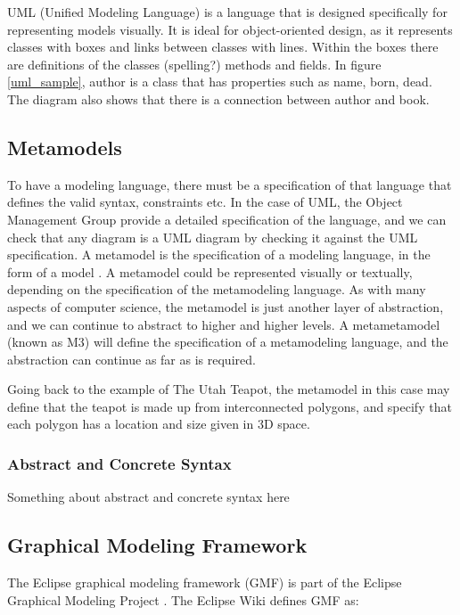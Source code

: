 UML (Unified Modeling Language) is a language that is designed specifically for representing models visually. It is ideal for object-oriented design, as it represents classes with boxes and links between classes with lines. Within the boxes there are definitions of the classes (spelling?) methods and fields. In figure \ref{uml_sample}, author is a class that has properties such as name, born, dead. The diagram also shows that there is a connection between author and book.

\subsection{Metamodels}
To have a modeling language, there must be a specification of that language that defines the valid syntax, constraints etc. In the case of UML, the Object Management Group provide a detailed specification \citep{umlSpec} of the language, and we can check that any diagram is a UML diagram by checking it against the UML specification.
A metamodel is the specification of a modeling language, in the form of a model \citep{brambillaBook}. A metamodel could be represented visually or textually, depending on the specification of the metamodeling language. As with many aspects of computer science, the metamodel is just another layer of abstraction, and we can continue to abstract to higher and higher levels. A metametamodel (known as M3) will define the specification of a metamodeling language, and the abstraction can continue as far as is required.

Going back to the example of The Utah Teapot, the metamodel in this case may define that the teapot is made up from interconnected polygons, and specify that each polygon has a location and size given in 3D space. 

\subsubsection{Abstract and Concrete Syntax}

Something about abstract and concrete syntax here

\subsection{Graphical Modeling Framework}

The Eclipse graphical modeling framework (GMF) is part of the Eclipse Graphical Modeling Project \citep{gmpSite}. The Eclipse Wiki \cite{gmpFAQ} defines GMF as:


